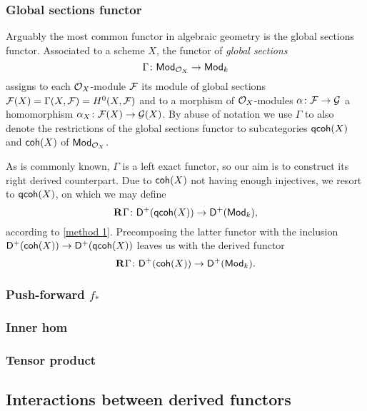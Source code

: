 \subsubsection{Global sections functor}
Arguably the most common functor in algebraic geometry is the global sections functor. Associated to a scheme $X$, the functor of \emph{global sections}
\[
    \Gamma \colon \mathsf{Mod}_{\mathcal O_X} \to \mathsf{Mod}_{k}
\]
assigns to each $\mathcal O_X$-module $\mathcal F$ its module of global sections $\mathcal F(X) = \Gamma(X, \mathcal F) = H^0(X, \mathcal F)$ and to a morphism of $\mathcal O_X$-modules $\alpha\colon \mathcal F \to \mathcal G$ a homomorphism $\alpha_X \colon \mathcal F(X) \to \mathcal G(X)$.
By abuse of notation we use $\Gamma$ to also denote the restrictions of the global sections functor to subcategories $\mathsf{qcoh}(X)$ and $\mathsf{coh}(X)$ of $\mathsf{Mod}_{\mathcal O_X}$.

As is commonly known, $\Gamma$ is a left exact functor, so our aim is to construct its right derived counterpart. Due to $\mathsf{coh}(X)$ not having enough injectives, we resort to $\mathsf{qcoh}(X)$, on which we may define 
\[
    \mathbf{R}^{}\Gamma\colon \mathsf{D}^+(\mathsf{qcoh}(X)) \to \mathsf{D}^+(\mathsf{Mod}_{k}),
\]
according to \ref{method 1}. Precomposing the latter functor with the inclusion $\mathsf{D}^+(\mathsf{coh}(X)) \to \mathsf{D}^+(\mathsf{qcoh}(X))$ leaves us with the derived functor
\[
    \mathbf{R}^{}\Gamma \colon \mathsf{D}^+(\mathsf{coh}(X)) \to \mathsf{D}^+(\mathsf{Mod}_{k}).
\]







\subsubsection{Push-forward $f_*$}
\subsubsection{Inner hom}
\subsubsection{Tensor product }

\subsection{Interactions between derived functors}

